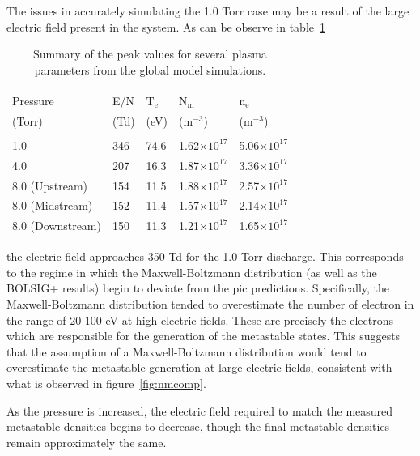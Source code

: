 The issues in accurately simulating the 1.0 Torr case may be a result of the
large electric field present in the system. As can be observe in
table~\ref{tbl:simsum}
\begin{table}
  \centering
  \caption{Summary of the peak values for several plasma parameters from the
  global model simulations.}
  \label{tbl:simsum}
  \begin{tabular}{lllll}
    \toprule \\
    Pressure         & E/N  & T$_\mathrm{e}$ & N$_\mathrm{m}$ & n$_\mathrm{e}$ \\
    (Torr)           & (Td) & (eV)           &  (m$^{-3}$)    & (m$^{-3}$) \\
    \midrule \\
    1.0              & 346  & 74.6           & 1.62$\times10^{17}$ & 
      5.06$\times10^{17}$ \\
    4.0              & 207  & 16.3           & 1.87$\times10^{17}$ &
      3.36$\times10^{17}$ \\
    8.0 (Upstream)   & 154  & 11.5           & 1.88$\times10^{17}$ &
      2.57$\times10^{17}$ \\
    8.0 (Midstream)  & 152  & 11.4           & 1.57$\times10^{17}$ & 
      2.14$\times10^{17}$ \\
    8.0 (Downstream) & 150  & 11.3           & 1.21$\times10^{17}$ &
      1.65$\times10^{17}$ \\
    \bottomrule
  \end{tabular}
\end{table}
the electric field approaches 350 Td for the 1.0 Torr discharge. This
corresponds to the regime in which the Maxwell-Boltzmann distribution (as well
as the BOLSIG+ results) begin to deviate from the \acs{pic} predictions.
Specifically, the Maxwell-Boltzmann distribution tended to overestimate the
number of electron in the range of 20-100 eV at high electric fields. These are
precisely the electrons which are responsible for the generation of the
metastable states. This suggests that the assumption of a Maxwell-Boltzmann
distribution would tend to overestimate the metastable generation at large
electric fields, consistent with what is observed in figure~\ref{fig:nmcomp}.

As the pressure is increased, the electric field required to match the measured
metastable densities begins to decrease, though the final metastable densities
remain approximately the same.

